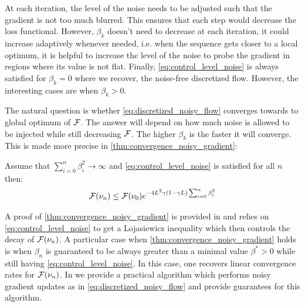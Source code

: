 \begin{remark}
	At each iteration, the level of the noise needs to be adjusted such that the gradient is not too much blurred. This ensures that each step would decrease the loss functional. However, $\beta_k$ doesn't need to decrease at each iteration, it could increase adaptively whenever needed, i.e. when  the sequence gets closer to a local optimum, it is helpful to increase the level of the noise to probe the gradient in regions where its value is not flat.
	Finally, \cref{eq:control_level_noise} is always satisfied for $\beta_k = 0$ where we recover, the noise-free discretized flow. However, the interesting cases are when $\beta_k>0$.
 \end{remark}
The natural question is whether \cref{eq:discretized_noisy_flow} converges towards to global optimum of ${{\mathcal F}}$. The answer will depend on how much noise is allowed to be injected while still decreasing ${{\mathcal F}}$. The higher $\beta_k$ is the faster it will converge. This is made more precise in \cref{thm:convergence_noisy_gradient}: 
 \begin{theorem}\label{thm:convergence_noisy_gradient}
 Assume that $\sum_{i=0}^n \beta_i^2 \rightarrow \infty $ and \cref{eq:control_level_noise} is satisfied for all $n$ then:
 \begin{align}
 	{{\mathcal F}}(\nu_n)\leq {{\mathcal F}}(\nu_0) e^{-4L^2\gamma(1-\gamma L)\sum_{i=0}^n \beta^2_i}
 \end{align}
 \end{theorem}
 A proof of \cref{thm:convergence_noisy_gradient} is provided in  and relies on \cref{eq:control_level_noise} to get a Lojasiewicz inequality which then controls the decay of ${{\mathcal F}}(\nu_n)$. A particular case when \cref{thm:convergence_noisy_gradient} holds is when $\beta_n$ is guaranteed to be always greater than a minimal value $\beta^*>0$ while still having \cref{eq:control_level_noise}. In this case, one recovers linear convergence rates for ${{\mathcal F}}(\nu_n)$.
In \label{subsec:euler_maruyama} we provide a practical algorithm which performs noisy gradient updates as in \cref{eq:discretized_noisy_flow} and provide guarantees for this algorithm.
 
 
 
